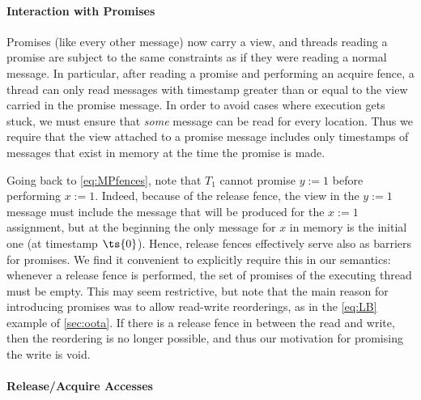 \paragraph{Interaction with Promises}

Promises (like every other message) now carry a view,
and threads reading a promise are subject to the same constraints as if they were reading a normal message.
In particular, after reading a promise and performing an acquire fence, a thread can only read messages
with timestamp greater than or equal to the view carried in the promise message.
In order to avoid cases where execution gets stuck, we must ensure that \emph{some} message can be read
for every location. Thus we require that the view attached to a promise message includes only timestamps of messages that exist in memory at the time the promise is made.

Going back to \ref{eq:MPfences}, note that $T_1$ cannot promise $y:=1$
before performing $x:=1$. Indeed, because of the release fence, the view in the $y:=1$ message must include the message
that will be produced for the $x:=1$ assignment, but at the beginning the only message for $x$ in memory is the initial one (at timestamp $\ts{0}$).
Hence, release fences effectively serve also as barriers for promises.
We find it convenient to explicitly require this in our semantics: whenever a release fence is performed,
the set of promises of the executing thread must be empty.
This may seem restrictive, but note that the main reason for introducing promises was to allow read-write reorderings,
as in the \ref{eq:LB} example of \cref{sec:oota}.
If there is a release fence in between the read and write, then the reordering is no longer possible, and thus our motivation for promising the write is void.

\paragraph{Release/Acquire Accesses}

